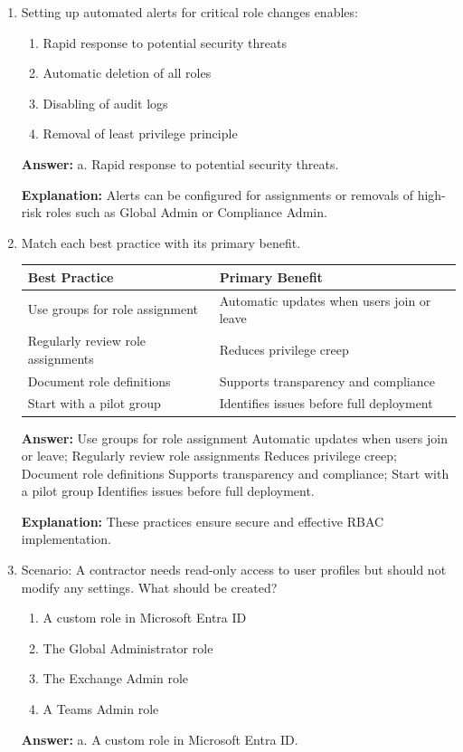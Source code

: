\documentclass[10pt]{article}
\begin{document}
\begin{enumerate}[leftmargin=*]
\textbf{Explanation:} It offers detailed views of who has admin roles and when assignments were made.

\item Setting up automated alerts for critical role changes enables:
\begin{enumerate}[label=\alph*., leftmargin=1.5em]
\item Rapid response to potential security threats
\item Automatic deletion of all roles
\item Disabling of audit logs
\item Removal of least privilege principle
\end{enumerate}
\textbf{Answer:} a. Rapid response to potential security threats.

\textbf{Explanation:} Alerts can be configured for assignments or removals of high-risk roles such as Global Admin or Compliance Admin.

\item Match each best practice with its primary benefit.

\begin{center}
\begin{tabular}{>{\raggedright\arraybackslash}p{} >{\raggedright\arraybackslash}p{}}
\toprule
\textbf{Best Practice} & \textbf{Primary Benefit} \\
\midrule
Use groups for role assignment & Automatic updates when users join or leave \\
Regularly review role assignments & Reduces privilege creep \\
Document role definitions & Supports transparency and compliance \\
Start with a pilot group & Identifies issues before full deployment \\
\bottomrule
\end{tabular}
\end{center}

\textbf{Answer:} Use groups for role assignment \textrightarrow{} Automatic updates when users join or leave; Regularly review role assignments \textrightarrow{} Reduces privilege creep; Document role definitions \textrightarrow{} Supports transparency and compliance; Start with a pilot group \textrightarrow{} Identifies issues before full deployment.

\textbf{Explanation:} These practices ensure secure and effective RBAC implementation.

\item Scenario: A contractor needs read-only access to user profiles but should not modify any settings. What should be created?
\begin{enumerate}[label=\alph*., leftmargin=1.5em]
\item A custom role in Microsoft Entra ID
\item The Global Administrator role
\item The Exchange Admin role
\item A Teams Admin role
\end{enumerate}
\textbf{Answer:} a. A custom role in Microsoft Entra ID.


\end{enumerate}
\end{document}
